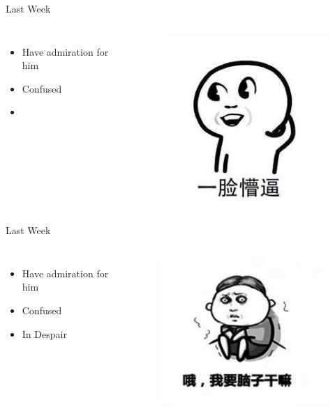 \begin{frame}[fragile]{Last Week}
	\begin{columns}[onlytextwidth]
		
		\begin{itemize}
			\item Have admiration for him
			\item Confused
			\item 
		\end{itemize}
		
		
		\begin{figure}
			\includegraphics[width=.5\linewidth]{mengbi.jpg}
		\end{figure}
		
	\end{columns}
\end{frame}

\begin{frame}[fragile]{Last Week}
	\begin{columns}[onlytextwidth]
		
		\begin{itemize}
			\item Have admiration for him
			\item Confused
			\item In Despair
		\end{itemize}
		
		
		\begin{figure}
			\includegraphics[width=.5\linewidth]{juewang.jpg}
		\end{figure}
		
	\end{columns}
\end{frame}



